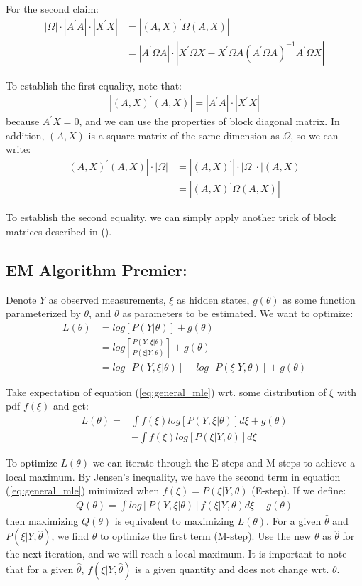 \documentclass[10pt]{article}
\numberwithin{equation}{section}
\begin{document}
For the second claim:
\begin{align*}
    |\Omega|\cdot|A^{'}A|\cdot|X^{'}X| &= |(A,X)^{'}\Omega(A,X)| \\
    &=|A^{'}\Omega A|\cdot|X^{'}\Omega X - X^{'}\Omega A(A^{'}\Omega A)^{-1}A^{'}\Omega X|
\end{align*}

To establish the first equality, note that:
\begin{align*}
    |(A,X)^{'}(A,X)| = |A^{'}A|\cdot|X^{'}X|
\end{align*}
because $A^{'}X=0$, and we can use the properties of block diagonal matrix. In addition, $(A,X)$ is a square matrix of the same dimension as $\Omega$, so we can write:
\begin{align*}
    |(A,X)^{'}(A,X)|\cdot|\Omega| &= |(A,X)^{'}|\cdot|\Omega|\cdot|(A,X)| \\
    &=|(A,X)^{'}\Omega(A,X)|
\end{align*}

To establish the second equality, we can simply apply another trick of block matrices described in (\cite{petersen2008matrix}).

\subsection{EM Algorithm Premier:} \label{ap:EM_proof}
Denote $Y$ as observed measurements, $\xi$ as hidden states, $g(\theta)$ as some function parameterized by $\theta$, and $\theta$ as parameters to be estimated. We want to optimize:
\begin{align}
    L(\theta) & = log[P(Y|\theta)] + g(\theta) \nonumber \\
    & = log\left[\frac{P(Y,\xi|\theta)}{P(\xi|Y,\theta)}\right] +g(\theta) \nonumber \\
    & = log[P(Y,\xi|\theta)] - log[P(\xi|Y,\theta)] +g(\theta) \label{eq:general_mle}
\end{align}

Take expectation of equation (\ref{eq:general_mle}) wrt. some distribution of $\xi$ with pdf $f(\xi)$ and get:
\begin{align}
    L(\theta) = & \int f(\xi)log[P(Y,\xi|\theta)]d\xi + g(\theta) \nonumber \\
    & - \int f(\xi)log[P(\xi|Y,\theta)]d\xi \nonumber
\end{align}

To optimize $L(\theta)$ we can iterate through the E steps and M steps to achieve a local maximum. By Jensen's inequality, we have the second term in equation (\ref{eq:general_mle}) minimized when $f(\xi)=P(\xi|Y,\theta)$ (E-step). If we define:
\begin{align}
    Q(\theta) = \int log[P(Y,\xi|\theta)]f(\xi|Y,\theta)d\xi + g(\theta) \label{eq:Q}
\end{align}
then maximizing $Q(\theta)$ is equivalent to maximizing $ L(\theta)$. For a given $\hat{\theta}$ and $P(\xi|Y, \hat{\theta})$, we find $\theta$ to optimize the first term (M-step). Use the new $\theta$ as $\hat{\theta}$ for the next iteration, and we will reach a local maximum. It is important to note that for a given $\hat{\theta}$, $f(\xi|Y, \hat{\theta})$ is a given quantity and does not change wrt. $\theta$. 
\end{document}
